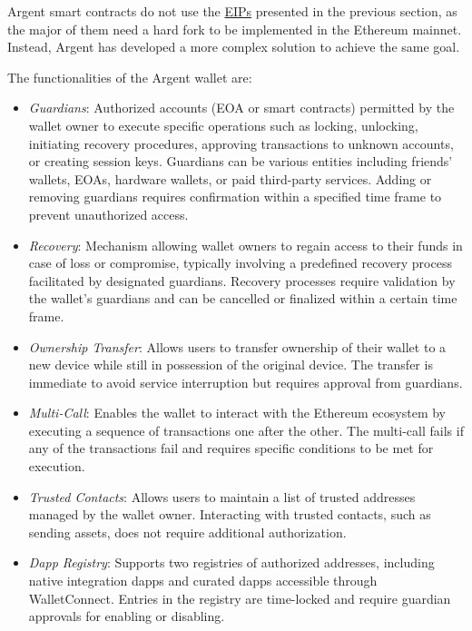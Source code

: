 
Argent smart contracts do not use the \hyperref[subsec:eips]{EIPs} presented in the previous section, as the major of them need a hard fork to be implemented in the Ethereum mainnet. Instead, Argent has developed a more complex solution to achieve the same goal. 


The functionalities of the Argent wallet are: \cite{argent-smart-wallet-specifications}
\begin{itemize}
    \item \textit{Guardians}: Authorized accounts (EOA or smart contracts) permitted by the wallet owner to execute specific operations such as locking, unlocking, initiating recovery procedures, approving transactions to unknown accounts, or creating session keys. Guardians can be various entities including friends' wallets, EOAs, hardware wallets, or paid third-party services. Adding or removing guardians requires confirmation within a specified time frame to prevent unauthorized access.
    \item \textit{Recovery}: Mechanism allowing wallet owners to regain access to their funds in case of loss or compromise, typically involving a predefined recovery process facilitated by designated guardians. Recovery processes require validation by the wallet's guardians and can be cancelled or finalized within a certain time frame.
    \item \textit{Ownership Transfer}: Allows users to transfer ownership of their wallet to a new device while still in possession of the original device. The transfer is immediate to avoid service interruption but requires approval from guardians.
    \item \textit{Multi-Call}: Enables the wallet to interact with the Ethereum ecosystem by executing a sequence of transactions one after the other. The multi-call fails if any of the transactions fail and requires specific conditions to be met for execution.
    \item \textit{Trusted Contacts}: Allows users to maintain a list of trusted addresses managed by the wallet owner. Interacting with trusted contacts, such as sending assets, does not require additional authorization.
    \item \textit{Dapp Registry}: Supports two registries of authorized addresses, including native integration dapps and curated dapps accessible through WalletConnect. Entries in the registry are time-locked and require guardian approvals for enabling or disabling.

\end{itemize}

